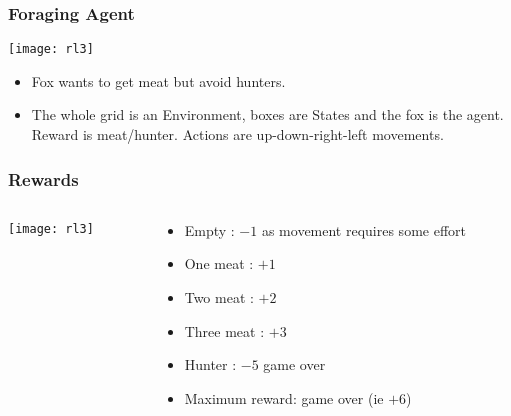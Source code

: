 \begin{frame}[fragile]\frametitle{Foraging Agent}

\begin{center}
\texttt{[image: rl3]}
\end{center}

\begin{itemize}
\item Fox wants to get meat but avoid hunters.
\item The whole grid is an Environment, boxes are States and the fox is the agent. Reward is meat/hunter. Actions are up-down-right-left movements.
\end{itemize}

\end{frame}


\begin{frame}[fragile]\frametitle{Rewards}

\begin{columns}
\begin{column}{0.5\textwidth}

\begin{center}
\texttt{[image: rl3]}
\end{center}

\end{column}
\begin{column}{0.5\textwidth}  %

\begin{itemize}
\item Empty : $-1$ as movement requires some effort
\item One meat : $+1$
\item Two meat : $+2$
\item Three meat : $+3$
\item Hunter : $-5$ game over
\item Maximum reward: game over (ie $+6$)
\end{itemize}

\end{column}
\end{columns}

\end{frame}

